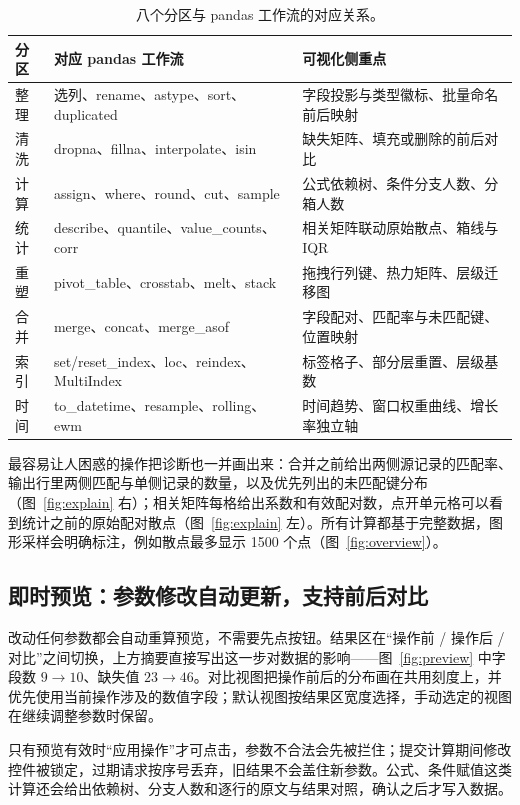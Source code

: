 \documentclass[UTF8,a4paper,11pt,fontset=fandol]{ctexart}
\begin{document}
\begin{table}[!htbp]
  \centering
  \small
  \begin{tabular}{@{}lll@{}}
    \toprule
    分区 & 对应 pandas 工作流 & 可视化侧重点 \\
    \midrule
    整理 & 选列、rename、astype、sort、duplicated & 字段投影与类型徽标、批量命名前后映射 \\
    清洗 & dropna、fillna、interpolate、isin & 缺失矩阵、填充或删除的前后对比 \\
    计算 & assign、where、round、cut、sample & 公式依赖树、条件分支人数、分箱人数 \\
    统计 & describe、quantile、value\_counts、corr & 相关矩阵联动原始散点、箱线与 IQR \\
    重塑 & pivot\_table、crosstab、melt、stack & 拖拽行列键、热力矩阵、层级迁移图 \\
    合并 & merge、concat、merge\_asof & 字段配对、匹配率与未匹配键、位置映射 \\
    索引 & set/reset\_index、loc、reindex、MultiIndex & 标签格子、部分层重置、层级基数 \\
    时间 & to\_datetime、resample、rolling、ewm & 时间趋势、窗口权重曲线、增长率独立轴 \\
    \bottomrule
  \end{tabular}
  \caption{八个分区与 pandas 工作流的对应关系。}\label{tab:coverage}
\end{table}

最容易让人困惑的操作把诊断也一并画出来：合并之前给出两侧源记录的匹配率、输出行里两侧匹配与单侧记录的数量，以及优先列出的未匹配键分布（图~\ref{fig:explain} 右）；相关矩阵每格给出系数和有效配对数，点开单元格可以看到统计之前的原始配对散点（图~\ref{fig:explain} 左）。所有计算都基于完整数据，图形采样会明确标注，例如散点最多显示 1500 个点（图~\ref{fig:overview}）。

\subsection{即时预览：参数修改自动更新，支持前后对比}

改动任何参数都会自动重算预览，不需要先点按钮。结果区在“操作前 / 操作后 / 对比”之间切换，上方摘要直接写出这一步对数据的影响——图~\ref{fig:preview} 中字段数 $9 \rightarrow 10$、缺失值 $23 \rightarrow 46$。对比视图把操作前后的分布画在共用刻度上，并优先使用当前操作涉及的数值字段；默认视图按结果区宽度选择，手动选定的视图在继续调整参数时保留。

只有预览有效时“应用操作”才可点击，参数不合法会先被拦住；提交计算期间修改控件被锁定，过期请求按序号丢弃，旧结果不会盖住新参数。公式、条件赋值这类计算还会给出依赖树、分支人数和逐行的原文与结果对照，确认之后才写入数据。
\end{document}
